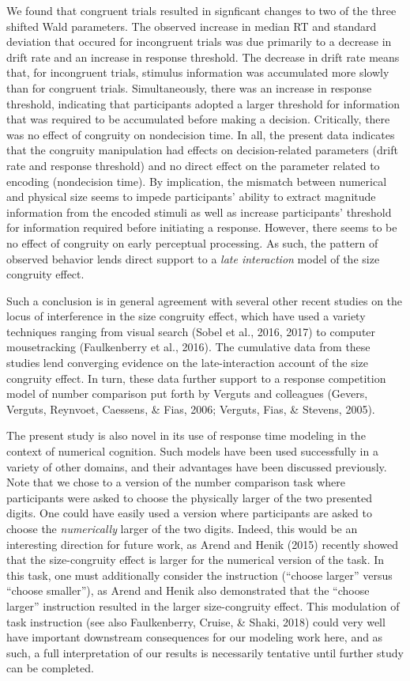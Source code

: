 \documentclass[english,,man]{apa6}
\theoremstyle{definition}
\theoremstyle{definition}
\theoremstyle{definition}
\theoremstyle{remark}
\begin{document}
We found that congruent trials resulted in signficant changes to two of
the three shifted Wald parameters. The observed increase in median RT
and standard deviation that occured for incongruent trials was due
primarily to a decrease in drift rate and an increase in response
threshold. The decrease in drift rate means that, for incongruent
trials, stimulus information was accumulated more slowly than for
congruent trials. Simultaneously, there was an increase in response
threshold, indicating that participants adopted a larger threshold for
information that was required to be accumulated before making a
decision. Critically, there was no effect of congruity on nondecision
time. In all, the present data indicates that the congruity manipulation
had effects on decision-related parameters (drift rate and response
threshold) and no direct effect on the parameter related to encoding
(nondecision time). By implication, the mismatch between numerical and
physical size seems to impede participants' ability to extract magnitude
information from the encoded stimuli as well as increase participants'
threshold for information required before initiating a response.
However, there seems to be no effect of congruity on early perceptual
processing. As such, the pattern of observed behavior lends direct
support to a \emph{late interaction} model of the size congruity effect.

Such a conclusion is in general agreement with several other recent
studies on the locus of interference in the size congruity effect, which
have used a variety techniques ranging from visual search (Sobel et al.,
2016, 2017) to computer mousetracking (Faulkenberry et al., 2016). The
cumulative data from these studies lend converging evidence on the
late-interaction account of the size congruity effect. In turn, these
data further support to a response competition model of number
comparison put forth by Verguts and colleagues (Gevers, Verguts,
Reynvoet, Caessens, \& Fias, 2006; Verguts, Fias, \& Stevens, 2005).

The present study is also novel in its use of response time modeling in
the context of numerical cognition. Such models have been used
successfully in a variety of other domains, and their advantages have
been discussed previously. Note that we chose to a version of the number
comparison task where participants were asked to choose the physically
larger of the two presented digits. One could have easily used a version
where participants are asked to choose the \emph{numerically} larger of
the two digits. Indeed, this would be an interesting direction for
future work, as Arend and Henik (2015) recently showed that the
size-congruity effect is larger for the numerical version of the task.
In this task, one must additionally consider the instruction
(\enquote{choose larger} versus \enquote{choose smaller}), as Arend and
Henik also demonstrated that the \enquote{choose larger} instruction
resulted in the larger size-congruity effect. This modulation of task
instruction (see also Faulkenberry, Cruise, \& Shaki, 2018) could very
well have important downstream consequences for our modeling work here,
and as such, a full interpretation of our results is necessarily
tentative until further study can be completed.
\end{document}
